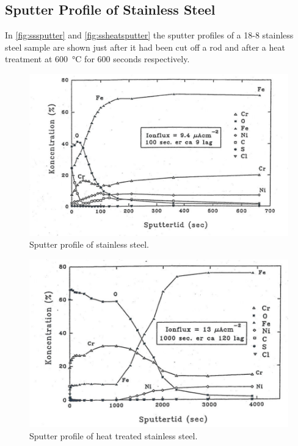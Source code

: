 \subsection{Sputter Profile of Stainless Steel}
In \autoref{fig:sssputter} and \autoref{fig:ssheatsputter} the sputter profiles of a 18-8 stainless steel sample are shown just after it had been cut off a rod and after a heat treatment at \SI{600}{\degreeCelsius} for 600 seconds respectively.

\begin{figure}[h!]
	\begin{center}
	\includegraphics[scale=4]{figures/07_08.png}
	\caption{Sputter profile of stainless steel.}
	\label{fig:sssputter}
	\end{center}
\end{figure}

\begin{figure}[h!]
	\begin{center}
	\includegraphics[scale=4]{figures/07_09.png}
	\caption{Sputter profile of heat treated
 stainless steel.}
	\label{fig:ssheatsputter}
	\end{center}
\end{figure}

